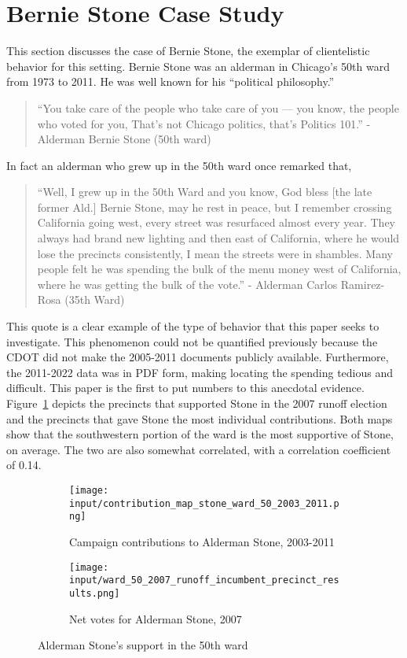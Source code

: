 \section{Bernie Stone Case Study}\label{sec:case_study}
This section discusses the case of Bernie Stone, the exemplar of clientelistic behavior for this setting.
Bernie Stone was an alderman in Chicago’s 50th ward from 1973 to 2011.
He was well known for his ``political philosophy.''

\begin{quotation}
    ``You take care of the people who take care of you — you know, the people who voted for you, That’s not Chicago politics, that’s Politics 101.'' - Alderman Bernie Stone (50th ward) \citep{BGA_berniequote}
\end{quotation}

In fact an alderman who grew up in the 50th ward once remarked that,

\begin{quotation}
    ``Well, I grew up in the 50th Ward and you know, God bless [the late former Ald.] Bernie Stone, may he rest in peace, but I remember crossing California going west, every street was resurfaced almost every year. They always had brand new lighting and then east of California, where he would lose the precincts consistently, I mean the streets were in shambles. Many people felt he was spending the bulk of the menu money west of California, where he was getting the bulk of the vote.'' - Alderman Carlos Ramirez-Rosa (35th Ward) \citep{ramirezrosaquote}
\end{quotation}

This quote is a clear example of the type of behavior that this paper seeks to investigate.
This phenomenon could not be quantified previously because the CDOT did not make the 2005-2011 documents publicly available. 
Furthermore, the 2011-2022 data was in PDF form, making locating the spending tedious and difficult.
This paper is the first to put numbers to this anecdotal evidence.
Figure~\ref{fig:stone_support_maps} depicts the precincts that supported Stone in the 2007 runoff election and the precincts that gave Stone the most individual contributions.
Both maps show that the southwestern portion of the ward is the most supportive of Stone, on average.
The two are also somewhat correlated, with a correlation coefficient of 0.14.
\begin{figure}[H]
    \centering
    \begin{subfigure}[b]{0.45\textwidth} %
    \texttt{[image: input/contribution\_map\_stone\_ward\_50\_2003\_2011.png]}
    \caption{Campaign contributions to Alderman Stone, 2003-2011}
    \end{subfigure}
    \hfill %
    \begin{subfigure}[b]{0.45\textwidth}
    \texttt{[image: input/ward\_50\_2007\_runoff\_incumbent\_precinct\_results.png]}
    \caption{Net votes for Alderman Stone, 2007}
    \end{subfigure}
    \caption{Alderman Stone's support in the 50th ward}
    \label{fig:stone_support_maps}
\end{figure}

